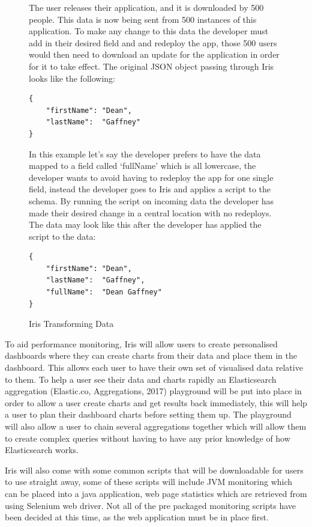 \documentclass[12pt,a4paper,titlepage]{report}
\begin{document}
\begin{figure}[H]
\begin{tcolorbox}

The user releases their application, and it is downloaded by 500 people. This data is now being sent from 500 instances of this application. To make any change to this data the developer must add in their desired field and and redeploy the app, those 500 users would then need to download an update for the application in order for it to take effect. The original JSON object passing through Iris looks like the following:
\begin{verbatim}
{
	"firstName": "Dean",
	"lastName":  "Gaffney"
}
\end{verbatim}

In this example let’s say the developer prefers to have the data mapped to a field called ‘fullName’ which is all lowercase, the developer wants to avoid having to redeploy the app for one single field, instead the developer goes to Iris and applies a script to the schema. By running the script on incoming data the developer has made their desired change in a central location with no redeploys. The data may look like this after the developer has applied the script to the data:
\begin{verbatim}
{
	"firstName": "Dean",
	"lastName":  "Gaffney",
	"fullName":  "Dean Gaffney"
}
\end{verbatim}
\end{tcolorbox}
\caption{Iris Transforming Data}
\end{figure}

To aid performance monitoring, Iris will allow users to create personalised dashboards where they can create charts from their data and place them in the dashboard. This allows each user to have their own set of visualised data relative to them. To help a user see their data and charts rapidly an Elasticsearch aggregation (Elastic.co, Aggregations, 2017) playground will be put into place in order to allow a user create charts and get results back immediately, this will help a user to plan their dashboard charts before setting them up. The playground will also allow a user to chain several aggregations together which will allow them to create complex queries without having to have any prior knowledge of how Elasticsearch works.

Iris will also come with some common scripts that will be downloadable for users to use straight away, some of these scripts will include JVM monitoring which can be placed into a java application, web page statistics which are retrieved from using Selenium web driver. Not all of the pre packaged monitoring scripts have been decided at this time, as the web application must be in place first.
\end{document}
